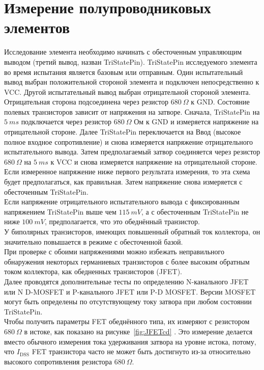 \section{Измерение полупроводниковых элементов}
Исследование элемента необходимо начинать с обесточенным управляющим
выводом (третий вывод, назван TriStatePin). TriStatePin исследуемого
элемента во время испытания является  базовым или отправным. Один
испытательный вывод выбран положительной стороной элемента и
подключен непосредственно к VCC. Другой испытательный вывод выбран
отрицательной стороной элемента.
Отрицательная сторона подсоединена через резистор \(680~\Omega\) к GND.
Состояние полевых транзисторов зависит
от напряжения на затворе. Сначала, TriStatePin на \(5~ms\) подключается
через резистор \(680~\Omega\) Ом к GND и измеряется напряжение на отрицательной
стороне. Далее TriStatePin переключается на Ввод (высокое полное
входное сопротивление) и снова измеряется напряжение отрицательного
испытательного вывода. Затем предполагаемый затвор соединяется через
резистор \(680~\Omega\) на \(5~ms\) к VCC и снова измеряется напряжение на
отрицательной  стороне. Если измеренное напряжение ниже первого
результата измерения, то эта схема будет предполагаться, как
правильная. Затем напряжение снова измеряется с обесточенным TriStatePin.\\

Если напряжение отрицательного испытательного вывода с фиксированным 
напряжением TriStatePin выше чем \(115~mV\), а с обесточенным TriStatePin 
не ниже \(100~mV\), предполагается, что это обеднённый транзистор.\\

У биполярных транзисторов, имеющих повышенный обратный ток коллектора,
он значительно повышается в режиме с обесточенной базой.\\

При проверке с обоими напряжениями можно избежать неправильного
обнаружения некоторых германиевых транзисторов с более высоким
обратным током коллектора, как обедненных транзисторов (JFET).\\

Далее проводятся дополнительные тесты по определению N-канального JFET
или N D-MOSFET и P-канального JFET или P-D MOSFET. Версии MOSFET
могут быть определены по отсутствующему току затвора при любом
состоянии TriStatePin.\\

Чтобы получить параметры FET обеднённого типа, их измеряют с резистором \(680~\Omega\) в истоке, 
как показано на рисунке~\ref{fig:JFETcd} . Это измерение делается вместо обычного измерения тока 
удерживания затвора на уровне истока, потому, что \(I_\mathrm{DSS}\) FET транзистора часто не может 
быть достигнуто из-за относительно высокого сопротивления резистора \(680~\Omega\).

